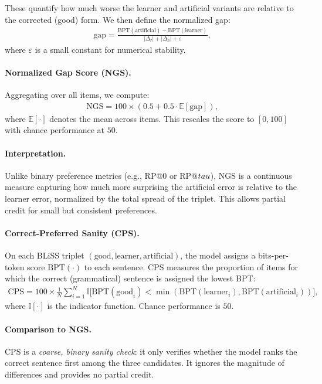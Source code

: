 These quantify how much worse the learner and artificial variants are relative to the corrected (good) form. We then define the normalized gap:
\begin{align}
\mathrm{gap} = \frac{\mathrm{BPT}(\text{artificial}) - \mathrm{BPT}(\text{learner})}{|\Delta_r| + |\Delta_h| + \varepsilon},
\end{align}
where $\varepsilon$ is a small constant for numerical stability.

\paragraph{Normalized Gap Score (NGS).}
Aggregating over all items, we compute:
\begin{align}
\mathrm{NGS} = 100 \times \left(0.5 + 0.5 \cdot \mathbb{E}[\mathrm{gap}]\right),
\end{align}
where $\mathbb{E}[\cdot]$ denotes the mean across items. This rescales the score to $[0, 100]$ with chance performance at $50$.

\paragraph{Interpretation.}
Unlike binary preference metrics (e.g., RP@0 or RP@$\\tau$), NGS is a continuous measure capturing how much more surprising the artificial error is relative to the learner error, normalized by the total spread of the triplet. This allows partial credit for small but consistent preferences.


\paragraph{Correct-Preferred Sanity (CPS).}
On each BLiSS triplet $(\text{good}, \text{learner}, \text{artificial})$, the model assigns a bits-per-token score $\mathrm{BPT}(\cdot)$ to each sentence. CPS measures the proportion of items for which the correct (grammatical) sentence is assigned the lowest BPT:
\begin{align}
\mathrm{CPS} = 100 \times \frac{1}{N} \sum_{i=1}^N 
\mathbb{I}\big[
\mathrm{BPT}(\text{good}_i) < \min(\mathrm{BPT}(\text{learner}_i), \mathrm{BPT}(\text{artificial}_i))
\big],
\end{align}
where $\mathbb{I}[\cdot]$ is the indicator function. Chance performance is $50$.

\paragraph{Comparison to NGS.}
CPS is a \emph{coarse, binary sanity check}: it only verifies whether the model ranks the correct sentence first among the three candidates. It ignores the magnitude of differences and provides no partial credit.

